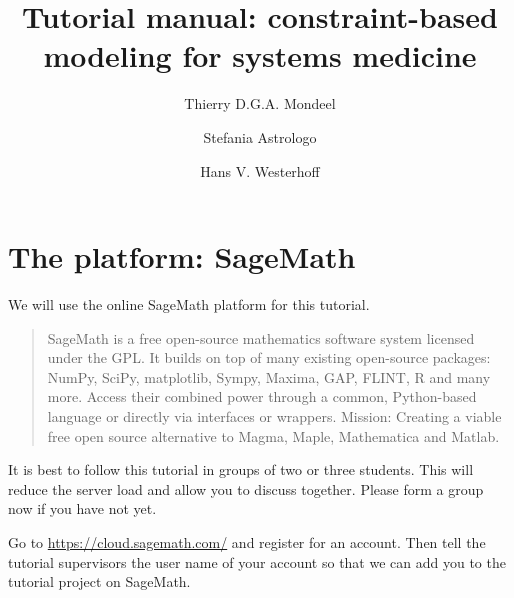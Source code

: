 \documentclass{article}
\title{Tutorial manual: constraint-based modeling for systems medicine }
\author{Thierry D.G.A. Mondeel \and Stefania Astrologo \and Hans V. Westerhoff}
\begin{document}
\maketitle

\tableofcontents

\section*{The platform: SageMath}

We will use the online SageMath platform for this tutorial.

\begin{quote}
SageMath is a free open-source mathematics software system licensed under the GPL. It builds on top of many existing open-source packages: NumPy, SciPy, matplotlib, Sympy, Maxima, GAP, FLINT, R and many more. Access their combined power through a common, Python-based language or directly via interfaces or wrappers.
Mission: Creating a viable free open source alternative to Magma, Maple, Mathematica and Matlab.
\end{quote}

\begin{tcolorbox}[width=\textwidth,colback={yellow},title={ASSIGNMENT},coltitle=white]

It is best to follow this tutorial in groups of two or three students. This will reduce the server load and allow you to discuss together. Please form a group now if you have not yet.
\end{tcolorbox}

\begin{tcolorbox}[width=\textwidth,colback={yellow},title={ASSIGNMENT},coltitle=white]

Go to \url{https://cloud.sagemath.com/} and register for an account. Then tell the tutorial supervisors the user name of your account so that we can add you to the tutorial project on SageMath.
\end{tcolorbox}
\end{document}
